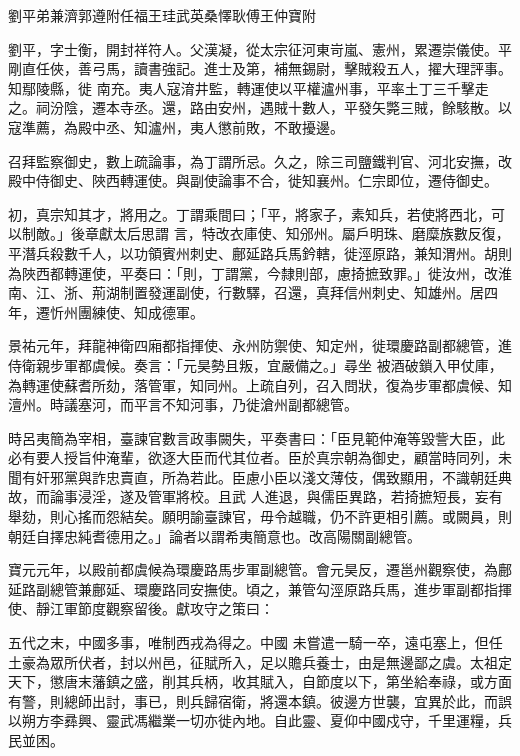 
\begin{pinyinscope}

 劉平弟兼濟郭遵附任福王珪武英桑懌耿傅王仲寶附



 劉平，字士衡，開封祥符人。父漢凝，從太宗征河東岢嵐、憲州，累遷崇儀使。平剛直任俠，善弓馬，讀書強記。進士及第，補無錫尉，擊賊殺五人，擢大理評事。知鄢陵縣，徙
 南充。夷人寇淯井監，轉運使以平權瀘州事，平率土丁三千擊走之。祠汾陰，遷本寺丞。還，路由安州，遇賊十數人，平發矢斃三賊，餘駭散。以寇準薦，為殿中丞、知瀘州，夷人懲前敗，不敢擾邊。



 召拜監察御史，數上疏論事，為丁謂所忌。久之，除三司鹽鐵判官、河北安撫，改殿中侍御史、陜西轉運使。與副使論事不合，徙知襄州。仁宗即位，遷侍御史。



 初，真宗知其才，將用之。丁謂乘間曰；「平，將家子，素知兵，若使將西北，可以制敵。」後章獻太后思謂
 言，特改衣庫使、知邠州。屬戶明珠、磨糜族數反復，平潛兵殺數千人，以功領賓州刺史、鄜延路兵馬鈐轄，徙涇原路，兼知渭州。胡則為陜西都轉運使，平奏曰：「則，丁謂黨，今隸則部，慮掎摭致罪。」徙汝州，改淮南、江、浙、荊湖制置發運副使，行數驛，召還，真拜信州刺史、知雄州。居四年，遷忻州團練使、知成德軍。



 景祐元年，拜龍神衛四廂都指揮使、永州防禦使、知定州，徙環慶路副都總管，進侍衛親步軍都虞候。奏言：「元昊勢且叛，宜嚴備之。」尋坐
 被酒破鎖入甲仗庫，為轉運使蘇耆所劾，落管軍，知同州。上疏自列，召入問狀，復為步軍都虞候、知澶州。時議塞河，而平言不知河事，乃徙滄州副都總管。



 時呂夷簡為宰相，臺諫官數言政事闕失，平奏書曰：「臣見範仲淹等毀訾大臣，此必有要人授旨仲淹輩，欲逐大臣而代其位者。臣於真宗朝為御史，顧當時同列，未聞有奸邪黨與詐忠賣直，所為若此。臣慮小臣以淺文薄伎，偶致顯用，不識朝廷典故，而論事浸淫，遂及管軍將校。且武
 人進退，與儒臣異路，若掎摭短長，妄有舉劾，則心搖而怨結矣。願明諭臺諫官，毋令越職，仍不許更相引薦。或闕員，則朝廷自擇忠純耆德用之。」論者以謂希夷簡意也。改高陽關副總管。



 寶元元年，以殿前都虞候為環慶路馬步軍副總管。會元昊反，遷邕州觀察使，為鄜延路副總管兼鄜延、環慶路同安撫使。頃之，兼管勾涇原路兵馬，進步軍副都指揮使、靜江軍節度觀察留後。獻攻守之策曰：



 五代之末，中國多事，唯制西戎為得之。中國
 未嘗遣一騎一卒，遠屯塞上，但任土豪為眾所伏者，封以州邑，征賦所入，足以贍兵養士，由是無邊鄙之虞。太祖定天下，懲唐末藩鎮之盛，削其兵柄，收其賦入，自節度以下，第坐給奉祿，或方面有警，則總師出討，事已，則兵歸宿衛，將還本鎮。彼邊方世襲，宜異於此，而誤以朔方李彞興、靈武馮繼業一切亦徙內地。自此靈、夏仰中國戍守，千里運糧，兵民並困。




\end{pinyinscope}
